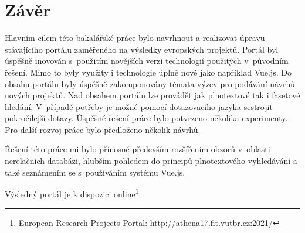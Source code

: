 \chapter{Závěr}
Hlavním cílem této bakalářské práce bylo navrhnout a realizovat úpravu stávajícího portálu zaměřeného na výsledky evropských projektů. Portál byl úspěšně inovován s~použitím novějších verzí technologií použitých v~původním řešení. Mimo to byly využity i technologie úplně nové jako například Vue.js. Do obsahu portálu byly úspěšně zakomponovány témata výzev pro podávání návrhů nových projektů. Nad obsahem portálu lze provádět jak plnotextové tak i fasetové hledání. V~případě potřeby je možné pomocí dotazovacího jazyka sestrojit pokročilejší dotazy. Úspěšné řešení práce bylo potvrzeno několika experimenty. Pro další rozvoj práce bylo předloženo několik návrhů.

Řešení této práce mi bylo přínosné především rozšířením obzorů v~oblasti nerelačních databázi, hlubším pohledem do principů plnotextového vyhledávání a také seznámením se s~používáním systému Vue.js.

Výsledný portál je k dispozici online\footnote{European Research Projects Portal: \url{http://athena17.fit.vutbr.cz:2021/}}.